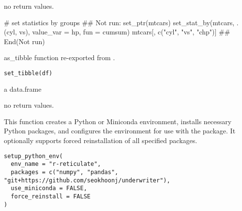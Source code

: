 \documentclass[letterpaper]{book}
\begin{document}
%
\begin{Value}
no return values.
\end{Value}
%
\begin{Examples}
\begin{ExampleCode}
# set statistics by groups
## Not run: 
set_ptr(mtcars)
set_stat_by(mtcars, .(cyl, vs), value_var = hp, fun = cumsum)
mtcars[, c("cyl", "vs", "chp")]
## End(Not run)

\end{ExampleCode}
\end{Examples}
%
\begin{Description}
as\_tibble function re-exported from .
\end{Description}
%
\begin{Usage}
\begin{verbatim}
set_tibble(df)
\end{verbatim}
\end{Usage}
%
\begin{Arguments}
\begin{ldescription}
\item[\code{df}] a data.frame
\end{ldescription}
\end{Arguments}
%
\begin{Value}
no return values.
\end{Value}
%
\begin{SeeAlso}
\end{SeeAlso}
%
\begin{Description}
This function creates a Python or Miniconda environment, installs necessary Python packages,
and configures the environment for use with the  package. It optionally supports
forced reinstallation of all specified packages.
\end{Description}
%
\begin{Usage}
\begin{verbatim}
setup_python_env(
  env_name = "r-reticulate",
  packages = c("numpy", "pandas", "git+https://github.com/seokhoonj/underwriter"),
  use_miniconda = FALSE,
  force_reinstall = FALSE
)
\end{verbatim}
\end{Usage}
%
\end{document}
